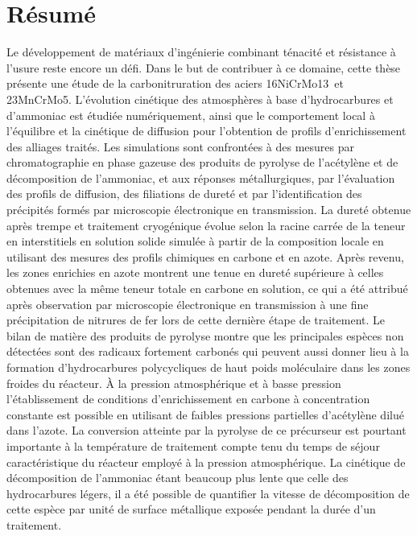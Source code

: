 \cleardoublepage{}
{}
\chapter*{Résumé}

Le développement de matériaux d'ingénierie combinant ténacité et résistance à l'usure reste encore un défi. Dans le but de contribuer à ce domaine, cette thèse présente une étude de la carbonitruration des aciers 16NiCrMo13 et 23MnCrMo5. L'évolution cinétique des atmosphères à base d'hydrocarbures et d'ammoniac est étudiée numériquement, ainsi que le comportement local à l'équilibre et la cinétique de diffusion pour l'obtention de profils d'enrichissement des alliages traités. Les simulations sont confrontées à des mesures par chromatographie en phase gazeuse des produits de pyrolyse de l'acétylène et de décomposition de l'ammoniac, et aux réponses métallurgiques, par l'évaluation des profils de diffusion, des filiations de dureté et par l'identification des précipités formés par microscopie électronique en transmission. La dureté obtenue après trempe et traitement cryogénique évolue selon la racine carrée de la teneur en interstitiels en solution solide simulée à partir de la composition locale en utilisant des mesures des profils chimiques en carbone et en azote. Après revenu, les zones enrichies en azote montrent une tenue en dureté supérieure à celles obtenues avec la même teneur totale en carbone en solution, ce qui a été attribué après observation par microscopie électronique en transmission à une fine précipitation de nitrures de fer lors de cette dernière étape de traitement. Le bilan de matière des produits de pyrolyse montre que les principales espèces non détectées sont des radicaux fortement carbonés qui peuvent aussi donner lieu à la formation d'hydrocarbures polycycliques de haut poids moléculaire dans les zones froides du réacteur. À la pression atmosphérique et à basse pression l'établissement de conditions d'enrichissement en carbone à concentration constante est possible en utilisant de faibles pressions partielles d'acétylène dilué dans l'azote. La conversion atteinte par la pyrolyse de ce précurseur est pourtant importante à la température de traitement compte tenu du temps de séjour caractéristique du réacteur employé à la pression atmosphérique. La cinétique de décomposition de l'ammoniac étant beaucoup plus lente que celle des hydrocarbures légers, il a été possible de quantifier la vitesse de décomposition de cette espèce par unité de surface métallique exposée pendant la durée d'un traitement.

